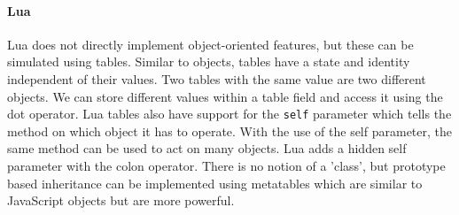\paragraph{Lua}
Lua does not directly implement object-oriented features, but these can be simulated using tables. Similar to objects, tables have a state and identity independent of their values. Two tables with the same value are two different objects. We can store different values within a table field and access it using the dot operator. Lua tables also have support for the \texttt{self} parameter which tells the method on which object it has to operate. With the use of the self parameter, the same method can be used to act on many objects. Lua adds a hidden self parameter with the colon operator. There is no notion of a 'class', but prototype based inheritance can be implemented using metatables which are similar to JavaScript objects but are more powerful. 
